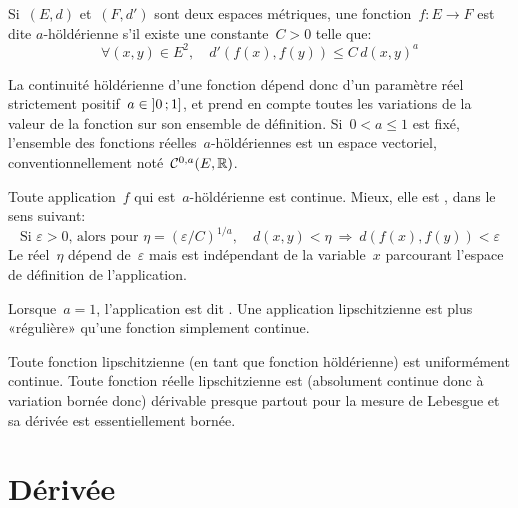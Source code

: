 \medskip
\begin{definition}
Si~$(E, d)$ et~$(F, d')$ sont deux espaces métriques, une fonction~$f: E \rightarrow F$ est dite $a$-höldérienne s'il existe une constante~$C > 0$ telle que:
\begin{equation}
  \forall (x, y) \in E^2,\quad d'\left(f(x), f(y)\right) \le C\,d\left(x,y\right)^a
\end{equation}
\end{definition}
La continuité höldérienne d'une fonction dépend donc d'un paramètre réel strictement positif~$a \in \mathopen{]}0\,;1\mathclose{]}$, et prend en compte toutes les variations de la valeur de la fonction sur son ensemble de définition.
\parvm
Si~$0 < a \le 1$ est fixé, l'ensemble des fonctions réelles~$a$-höldériennes est un espace vectoriel, conventionnellement noté~$\mathcal{C}^{0, a}(E,\mathbb R)$.

\medskip
\begin{theoreme}
Toute application~$f$ qui est~$a$-höldérienne est continue. Mieux, elle est , dans le sens suivant:
\begin{equation}
\text{Si } \varepsilon>0\text{, alors pour } \eta = \left( \varepsilon / C \right)^{1 / a},\quad d\left( x, y \right) < \eta \ \Rightarrow\ d\left( f(x), f(y) \right) < \varepsilon
\end{equation}
Le réel~$\eta$ dépend de~$\varepsilon$ mais est indépendant de la variable~$x$ parcourant l'espace de définition de l'application.
\end{theoreme}
\medskipvm
\begin{definition}
Lorsque~$a = 1$, l'application est dit .
Une application lipschitzienne est plus «régulière» qu'une fonction simplement continue.
\end{definition}
Toute fonction lipschitzienne (en tant que fonction höldérienne) est uniformément continue.
\parvm
Toute fonction réelle lipschitzienne est (absolument continue donc à variation bornée donc) dérivable presque partout pour la mesure de Lebesgue et sa dérivée est essentiellement bornée.

\medskip
\section{Dérivée}\label{Sec-Derivee}

